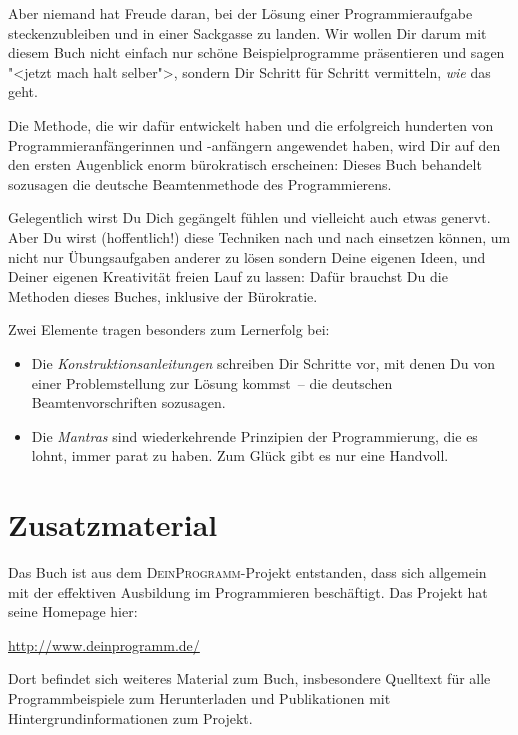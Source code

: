 Aber niemand hat Freude daran, bei der Lösung einer Programmieraufgabe
steckenzubleiben und in einer Sackgasse zu landen.  Wir wollen Dir
darum mit diesem Buch nicht einfach nur schöne Beispielprogramme
präsentieren und sagen "<jetzt mach halt selber">, sondern Dir Schritt
für Schritt vermitteln, \emph{wie} das geht.

Die Methode, die wir dafür entwickelt haben und die erfolgreich
hunderten von Programmieranfängerinnen und -anfängern angewendet
haben, wird Dir auf den den ersten Augenblick enorm bürokratisch
erscheinen: Dieses Buch behandelt sozusagen die deutsche
Beamtenmethode des Programmierens.

Gelegentlich wirst Du Dich gegängelt fühlen und vielleicht auch etwas
genervt.  Aber Du wirst (hoffentlich!) diese Techniken nach und nach
einsetzen können, um nicht nur Übungsaufgaben anderer zu lösen sondern
Deine eigenen Ideen, und Deiner eigenen Kreativität freien Lauf zu
lassen: Dafür brauchst Du die Methoden dieses Buches, inklusive der
Bürokratie.

Zwei Elemente tragen besonders zum Lernerfolg bei:
%
\begin{itemize}
\item Die \textit{Konstruktionsanleitungen} schreiben Dir Schritte
  vor, mit denen Du von einer Problemstellung zur Lösung kommst~-- die
  deutschen Beamtenvorschriften sozusagen.
\item Die \textit{Mantras} sind wiederkehrende Prinzipien der
  Programmierung, die es lohnt, immer parat zu haben.  Zum Glück gibt
  es nur eine Handvoll.
\end{itemize}
%

\section{Zusatzmaterial}

Das Buch ist aus dem \textsc{DeinProgramm}-Projekt entstanden, dass
sich allgemein mit der effektiven Ausbildung im Programmieren
beschäftigt.  Das Projekt hat seine Homepage hier:
%
\begin{center}
  \url{http://www.deinprogramm.de/}
\end{center}
%
Dort befindet sich weiteres Material zum Buch, insbesondere Quelltext
für alle Programmbeispiele zum Herunterladen und Publikationen mit
Hintergrundinformationen zum Projekt.



